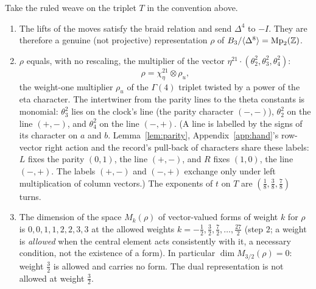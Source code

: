 \begin{theorem}\label{thm:theta}
Take the ruled weave on the triplet $T$ in the convention above.
\begin{enumerate}
\item The lifts of the moves satisfy the braid relation and send $\Delta^4$ to $-I$. They are therefore a genuine
  (not projective) representation $\rho$ of $B_3/\langle\Delta^8\rangle=\mathrm{Mp}_2(\mathbb{Z})$.
\item $\rho$ equals, with no rescaling, the multiplier of the vector $\eta^{21}\cdot(\theta_2^2,\theta_3^2,\theta_4^2)$:
  \[
    \rho=\chi_\eta^{21}\otimes\rho_u ,
  \]
  the weight-one multiplier $\rho_u$ of the $\Gamma(4)$ triplet twisted by a power of the eta character. The intertwiner
  from the parity lines to the theta constants is monomial: $\theta_3^2$ lies on the clock's line (the parity
  character $(-,-)$), $\theta_2^2$ on the line $(+,-)$, and $\theta_4^2$ on the line $(-,+)$. (A line is labelled by the
  signs of its character on $a$ and $b$. Lemma~\ref{lem:parity}, Appendix~\ref{app:hand}'s row-vector right action and
  the record's pull-back of characters share these labels: $L$ fixes the parity $(0,1)$, the line $(+,-)$, and $R$ fixes
  $(1,0)$, the line $(-,+)$. The labels $(+,-)$ and $(-,+)$ exchange only under left multiplication of column vectors.)
  The exponents of $t$ on $T$ are
  $(\tfrac18,\tfrac38,\tfrac78)$ turns.
\item The dimension of the space $M_k(\rho)$ of vector-valued forms of weight $k$ for $\rho$ is
  $0,0,1,1,2,2,3,3$ at the allowed weights $k=-\tfrac12,\tfrac32,\tfrac72,\dots,\tfrac{27}{2}$ (step $2$; a weight is
  \emph{allowed} when the central element acts consistently with it, a necessary condition, not the existence of a
  form). In particular $\dim M_{3/2}(\rho)=0$: weight $\tfrac32$ is allowed and carries no form. The dual
  representation is not allowed at weight $\tfrac32$.
\end{enumerate}
\end{theorem}
